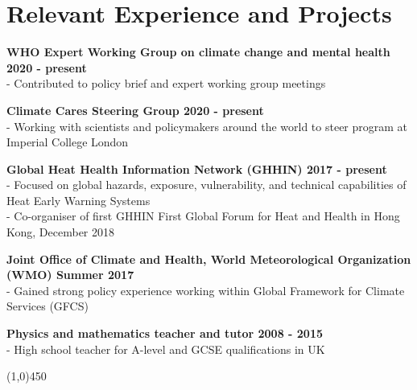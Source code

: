 \section*{Relevant Experience and Projects}

\noindent \textbf{WHO Expert Working Group on climate change and mental health \hfill 2020 - present}\\
- Contributed to policy brief and expert working group meetings\medskip

\noindent \textbf{Climate Cares Steering Group \hfill 2020 - present}\\
- Working with scientists and policymakers around the world to steer program at Imperial College London \medskip

\noindent \textbf{Global Heat Health Information Network (GHHIN) \hfill 2017 - present}\\
- Focused on global hazards, exposure, vulnerability, and technical capabilities of Heat Early Warning Systems\\
- Co-organiser of first GHHIN First Global Forum for Heat and Health in Hong Kong, December 2018\medskip

\noindent \textbf{Joint Office of Climate and Health, World Meteorological Organization (WMO) \hfill Summer 2017}\\
\noindent - Gained strong policy experience working within Global Framework for Climate Services (GFCS)\medskip

\noindent \textbf{Physics and mathematics teacher and tutor \hfill 2008 - 2015}\\
- High school teacher for A-level and GCSE qualifications in UK

\begin{center} \line(1,0){450} \end{center}